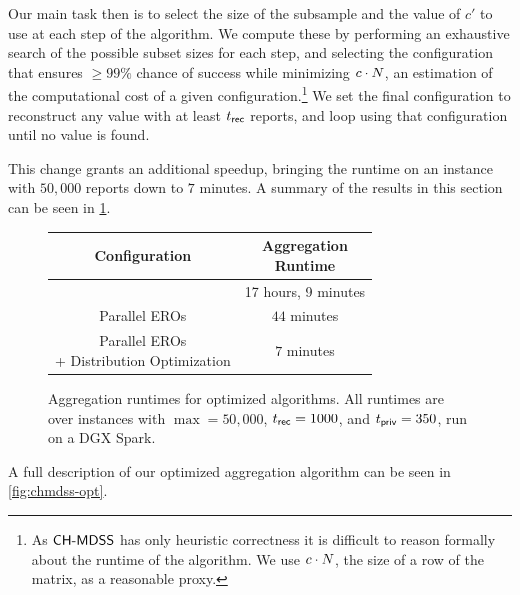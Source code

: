 Our main task then is to select the size of the subsample and the value of $c'$ to use at each step of the algorithm.
We compute these by performing an exhaustive search of the possible subset sizes for each step, and selecting the configuration that ensures $\geq99\%$ chance of success while minimizing $c \cdot N$, an estimation of the computational cost of a given configuration.\footnote{As ${\sf CH\text{-}MDSS}$ has only heuristic correctness it is difficult to reason formally about the runtime of the algorithm. We use $c \cdot N$, the size of a row of the matrix, as a reasonable proxy.}
We set the final configuration to reconstruct any value with at least $t_{\sf rec}$ reports, and loop using that configuration until no value is found.

This change grants an additional speedup, bringing the runtime on an instance with $50{,}000$ reports down to $7$ minutes.
A summary of the results in this section can be seen in \cref{fig:optimization-runtimes}.

\begin{figure}[h]
	\centering
	\begin{tabular}{ |c|c| }
		\hline
		Configuration                                           & \makecell{Aggregation\\ Runtime} \\
		\hline
		\cite{\citeairtag} Baseline                             & 17 hours, 9 minutes              \\
		\hline
		Parallel EROs                                           & $44$  minutes                    \\
		\hline
		\makecell{Parallel EROs \\ + Distribution Optimization} & $7$ minutes                      \\
		\hline
	\end{tabular}
	\caption{Aggregation runtimes for optimized algorithms. All runtimes are over instances with $\max = 50{,}000$, $t_{\sf rec}=1000$, and $t_{\sf priv}= 350$, run on a DGX Spark.}
	\label{fig:optimization-runtimes}
\end{figure}

A full description of our optimized aggregation algorithm can be seen in \cref{fig:chmdss-opt}.


